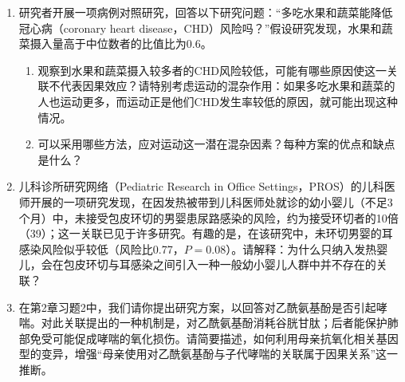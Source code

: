 \begin{enumerate}
\item 研究者开展一项病例对照研究，回答以下研究问题：“多吃水果和蔬菜能降低冠心病（coronary heart disease，CHD）风险吗？”假设研究发现，水果和蔬菜摄入量高于中位数者的比值比为0.6。
\begin{enumerate}
\item 观察到水果和蔬菜摄入较多者的CHD风险较低，可能有哪些原因使这一关联不代表因果效应？请特别考虑运动的混杂作用：如果多吃水果和蔬菜的人也运动更多，而运动正是他们CHD发生率较低的原因，就可能出现这种情况。
\item 可以采用哪些方法，应对运动这一潜在混杂因素？每种方案的优点和缺点是什么？
\end{enumerate}
\item 儿科诊所研究网络（Pediatric Research in Office Settings，PROS）的儿科医师开展的一项研究发现，在因发热被带到儿科医师处就诊的幼小婴儿（不足3个月）中，未接受包皮环切的男婴患尿路感染的风险，约为接受环切者的10倍（39）；这一关联已见于许多研究。有趣的是，在该研究中，未环切男婴的耳感染风险似乎较低（风险比0.77，$P=0.08$）。请解释：为什么只纳入发热婴儿，会在包皮环切与耳感染之间引入一种一般幼小婴儿人群中并不存在的关联？
\item 在第2章习题2中，我们请你提出研究方案，以回答对乙酰氨基酚是否引起哮喘。对此关联提出的一种机制是，对乙酰氨基酚消耗谷胱甘肽；后者能保护肺部免受可能促成哮喘的氧化损伤。请简要描述，如何利用母亲抗氧化相关基因型的变异，增强“母亲使用对乙酰氨基酚与子代哮喘的关联属于因果关系”这一推断。
\end{enumerate}
